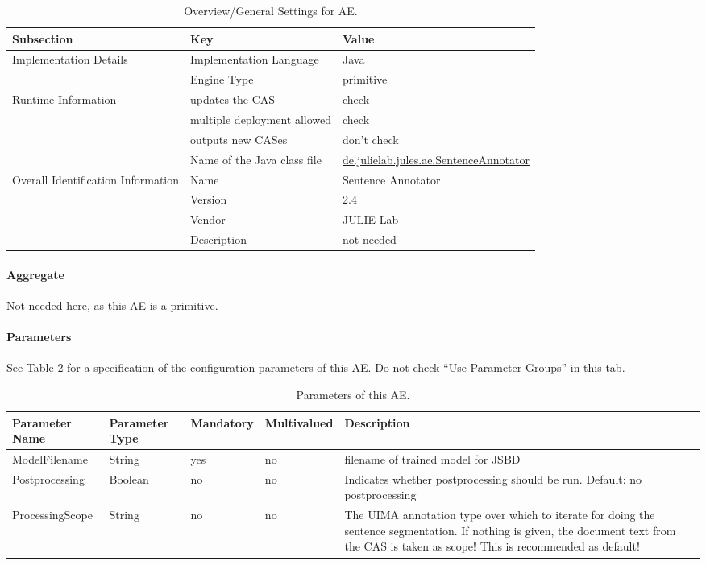 \documentclass[11pt,a4paper,halfparskip]{scrartcl}
\begin{document}
\begin{table}[h!]
  \centering
  \begin{tabular}{|p{3.5cm}|p{4cm}|p{6cm}|}
    \hline
    Subsection & Key & Value \\
    \hline\hline
    Implementation Details & Implementation Language & Java \\
    \cline{2-3}
    & Engine Type & primitive \\
    \hline
    Runtime Information & updates the CAS & check \\
    \cline{2-3}
    & multiple deployment allowed & check \\
    \cline{2-3}
    & outputs new CASes &  don't check \\
    \cline{2-3}
    & Name of the Java class file & \url{de.julielab.jules.ae.SentenceAnnotator}\\
    \hline
    Overall Identification Information & Name &  Sentence Annotator \\
    \cline{2-3}
    & Version &  2.4 \\
    \cline{2-3}
    & Vendor & JULIE Lab\\
    \cline{2-3}
    & Description & not needed\\
    \hline
  \end{tabular}
  \caption{Overview/General Settings for AE.}
  \label{tab:overview}
\end{table}


\paragraph{Aggregate}
Not needed here, as this AE is a primitive.

\paragraph{Parameters}
\label{sss:parameters}

See Table \ref{tab:parameters} for a specification of the
configuration parameters of this AE. Do not check ``Use Parameter
Groups'' in this tab.

\begin{table}[h!]
  \centering
  \begin{tabular}{|p{4cm}|p{2cm}|p{2cm}|p{2cm}|p{4cm}|}
    \hline
    Parameter Name & Parameter Type & Mandatory & Multivalued & Description \\
    \hline\hline
    ModelFilename & String & yes & no & filename of trained model for
    JSBD\\
    \hline
    Postprocessing & Boolean & no & no & Indicates whether postprocessing should be run. Default: no postprocessing\\
    \hline
    ProcessingScope & String & no & no & The UIMA annotation type  over which to iterate for doing the sentence segmentation. If nothing is given, the document text from the CAS is taken as scope! This is recommended as default!\\
    \hline
  \end{tabular}
  \caption{Parameters of this AE.}
  \label{tab:parameters}
\end{table}
\end{document}

